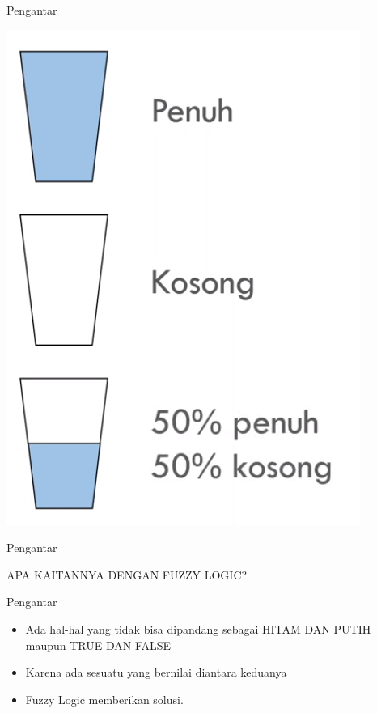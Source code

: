 \documentclass[pdflatex,compress,mathserif]{beamer}
\begin{document}
\begin{frame}{Pengantar}
	\begin{center}
		\includegraphics[height=0.7\textheight]{img/04}
	\end{center}
\end{frame}

\begin{frame}{Pengantar}
	\begin{center}
		\Large{APA KAITANNYA DENGAN FUZZY LOGIC?}
	\end{center}
\end{frame}

\begin{frame}{Pengantar}
	\begin{itemize}
		\item Ada hal-hal yang tidak bisa dipandang sebagai HITAM DAN PUTIH maupun TRUE DAN FALSE
		\item Karena ada sesuatu yang bernilai diantara keduanya
		\item Fuzzy Logic memberikan solusi.
	\end{itemize}
\end{frame}
\end{document}
